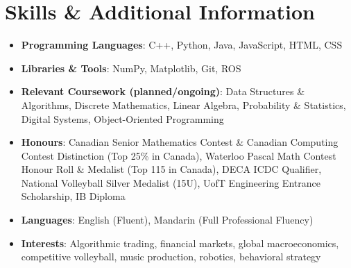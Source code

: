 \documentclass[letterpaper,11pt]{article}
\newcommand{\resumeItem}[2]{
  \item\small{
    \textbf{#1}{: #2 \vspace{-2pt}}
  }
}
\newcommand{\resumeSubHeadingListStart}{\begin{itemize}[leftmargin=*]}
\newcommand{\resumeSubHeadingListEnd}{\end{itemize}}
\begin{document}
\section{Skills \& Additional Information}
 \resumeSubHeadingListStart
   \resumeItem{Programming Languages}{C++, Python, Java, JavaScript, HTML, CSS}
   \resumeItem{Libraries \& Tools}{NumPy, Matplotlib, Git, ROS}
   \resumeItem{Relevant Coursework (planned/ongoing)}
     {Data Structures \& Algorithms, Discrete Mathematics, Linear Algebra, Probability \& Statistics, Digital Systems, Object-Oriented Programming}
   \resumeItem{Honours}{Canadian Senior Mathematics Contest \& Canadian Computing Contest Distinction (Top 25\% in Canada), Waterloo Pascal Math Contest Honour Roll \& Medalist (Top 115 in Canada), DECA ICDC Qualifier, National Volleyball Silver Medalist (15U), UofT Engineering Entrance Scholarship, IB Diploma}
   \resumeItem{Languages}{English (Fluent), Mandarin (Full Professional Fluency)}
   \resumeItem{Interests}{Algorithmic trading, financial markets, global macroeconomics, competitive volleyball, music production, robotics, behavioral strategy}
 \resumeSubHeadingListEnd

\end{document}
